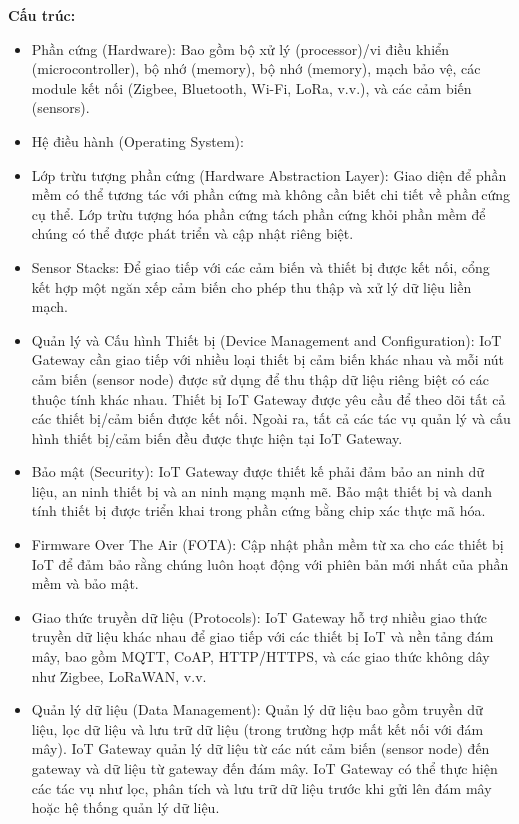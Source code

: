         \textbf{Cấu trúc:}
        \begin{itemize}
            \item Phần cứng (Hardware): Bao gồm bộ xử lý (processor)/vi điều khiển (microcontroller), bộ nhớ (memory), bộ nhớ (memory), mạch bảo vệ, các module kết nối (Zigbee, Bluetooth, Wi-Fi, LoRa, v.v.), và các cảm biến (sensors).
            \item Hệ điều hành (Operating System):
            \item Lớp trừu tượng phần cứng (Hardware Abstraction Layer): Giao diện để phần mềm có thể tương tác với phần cứng mà không cần biết chi tiết về phần cứng cụ thể. Lớp trừu tượng hóa phần cứng tách phần cứng khỏi phần mềm để chúng có thể được phát triển và cập nhật riêng biệt. 
            \item Sensor Stacks: Để giao tiếp với các cảm biến và thiết bị được kết nối, cổng kết hợp một ngăn xếp cảm biến cho phép thu thập và xử lý dữ liệu liền mạch. 
            \item Quản lý và Cấu hình Thiết bị (Device Management and Configuration): IoT Gateway cần giao tiếp với nhiều loại thiết bị cảm biến khác nhau và mỗi nút cảm biến (sensor node) được sử dụng để thu thập dữ liệu riêng biệt có các thuộc tính khác nhau. Thiết bị IoT Gateway được yêu cầu để theo dõi tất cả các thiết bị/cảm biến được kết nối. Ngoài ra, tất cả các tác vụ quản lý và cấu hình thiết bị/cảm biến đều được thực hiện tại IoT Gateway.
            \item Bảo mật (Security): IoT Gateway được thiết kế phải đảm bảo an ninh dữ liệu, an ninh thiết bị và an ninh mạng mạnh mẽ. Bảo mật thiết bị và danh tính thiết bị được triển khai trong phần cứng bằng chip xác thực mã hóa.
            \item Firmware Over The Air (FOTA): Cập nhật phần mềm từ xa cho các thiết bị IoT để đảm bảo rằng chúng luôn hoạt động với phiên bản mới nhất của phần mềm và bảo mật.
            \item Giao thức truyền dữ liệu (Protocols): IoT Gateway hỗ trợ nhiều giao thức truyền dữ liệu khác nhau để giao tiếp với các thiết bị IoT và nền tảng đám mây, bao gồm MQTT, CoAP, HTTP/HTTPS, và các giao thức không dây như Zigbee, LoRaWAN, v.v.
            \item Quản lý dữ liệu (Data Management): Quản lý dữ liệu bao gồm truyền dữ liệu, lọc dữ liệu và lưu trữ dữ liệu (trong trường hợp mất kết nối với đám mây). IoT Gateway quản lý dữ liệu từ các nút cảm biến (sensor node) đến gateway và dữ liệu từ gateway đến đám mây. IoT Gateway có thể thực hiện các tác vụ như lọc, phân tích và lưu trữ dữ liệu trước khi gửi lên đám mây hoặc hệ thống quản lý dữ liệu.

\end{itemize}

